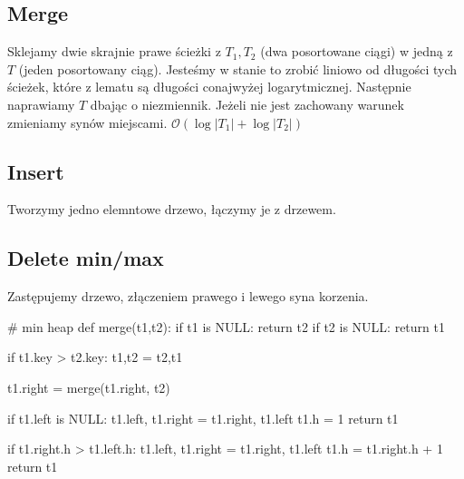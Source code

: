 \documentclass{article}
\begin{document}
\subsection*{Merge}
Sklejamy dwie skrajnie prawe ścieżki z $T_1,T_2$ (dwa posortowane ciągi) w jedną z $T$ (jeden posortowany ciąg). Jesteśmy w stanie to zrobić liniowo od długości tych ścieżek, które z lematu są długości conajwyżej logarytmicznej. Następnie naprawiamy $T$ dbając o niezmiennik. Jeżeli nie jest zachowany warunek zmieniamy synów miejscami. $\mathcal{O}(\log{|T_1|} + \log{|T_2|})$
\subsection*{Insert}
Tworzymy jedno elemntowe drzewo, łączymy je z drzewem.
\subsection*{Delete min/max}
Zastępujemy drzewo, złączeniem prawego i lewego syna korzenia.
\begin{python}
# min heap
def merge(t1,t2):
  if t1 is NULL:
    return t2
  if t2 is NULL:
    return t1
  
  if t1.key > t2.key:
    t1,t2 = t2,t1

  t1.right = merge(t1.right, t2)

  if t1.left is NULL:
    t1.left, t1.right = t1.right, t1.left
    t1.h = 1
    return t1

  if t1.right.h > t1.left.h:
    t1.left, t1.right = t1.right, t1.left
  t1.h = t1.right.h + 1
  return t1
\end{python}
\clearpage
\end{document}
